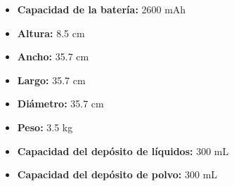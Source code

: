 \documentclass{article}
\begin{document}
\begin{adjustwidth}{2em}{}
\begin{itemize}
\begin{itemize}
    \item \textbf {Capacidad de la batería:} 2600 mAh
    \item \textbf {Altura:} 8.5 cm
    \item \textbf {Ancho:} 35.7 cm
    \item \textbf {Largo:} 35.7 cm
    \item \textbf {Diámetro:} 35.7 cm
    \item \textbf {Peso:} 3.5 kg
    \item \textbf {Capacidad del depósito de líquidos:} 300 mL
    \item \textbf {Capacidad del depósito de polvo:} 300 mL
        \end{itemize}
    \end{itemize}

    \vspace{1\baselineskip} %
    \end{adjustwidth}
\end{document}
